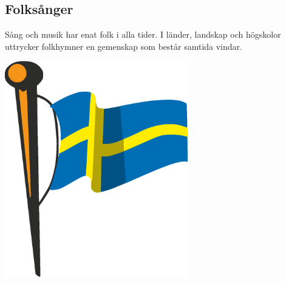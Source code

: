 \begin{flushleft}
\section{Folksånger}
{\Large
Sång och musik har enat folk i alla tider. I länder, landskap och högskolor uttrycker folkhymner en gemenskap som består samtida vindar.
}
\end{flushleft}

\vspace{2cm}
\begin{center}
\includegraphics[width=8cm]{bilder/sverige.eps}
\end{center}

\newpage
{}
\newpage
{}
\newpage
{}
\newpage
{}
\newpage
{}
\newpage
{}
\newpage
{}
